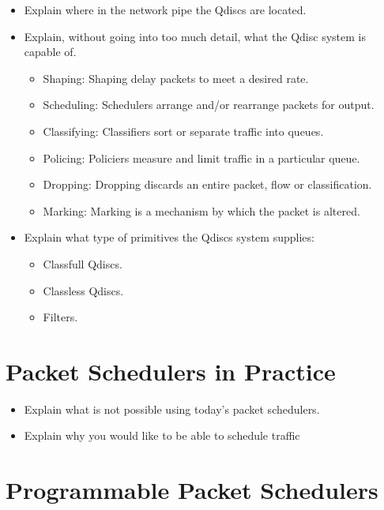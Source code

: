 \documentclass[sigconf, nonacm]{acmart}
\begin{document}
\begin{itemize}
  \item Explain where in the network pipe the Qdiscs are located.
  \item Explain, without going into too much detail, what the Qdisc system is capable of.
        \begin{itemize}
          \item Shaping: Shaping delay packets to meet a desired rate.
          \item Scheduling: Schedulers arrange and/or rearrange packets for output.
          \item Classifying: Classifiers sort or separate traffic into queues.
          \item Policing: Policiers measure and limit traffic in a particular queue.
          \item Dropping: Dropping discards an entire packet, flow or classification.
          \item Marking: Marking is a mechanism by which the packet is altered.
        \end{itemize}
  \item Explain what type of primitives the Qdiscs system supplies:
        \begin{itemize}
          \item Classfull Qdiscs.
          \item Classless Qdiscs.
          \item Filters.
        \end{itemize}
\end{itemize}


\section{Packet Schedulers in Practice}


\begin{itemize}
  \item Explain what is not possible using today's packet schedulers.
  \item Explain why you would like to be able to schedule traffic
\end{itemize}


\section{Programmable Packet Schedulers}
\end{document}
